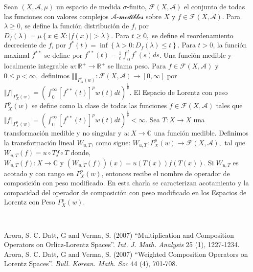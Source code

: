\begin{titlepage}
\begin{minipage}{0.85\linewidth}
\begin{minipage}{0.85\linewidth}
\begin{resumen}
Sean \emph{$(X,\mathcal{A},\mu)$ }un espacio de medida $\sigma$-finito,
$\mathcal{F}(X,\mathcal{A})$ el conjunto de todas las funciones con
valores complejos $\mathcal{A\textrm{-medibles}}$ sobre $X$ y $f\in\mathcal{F}(X,\mathcal{A})$.
Para $\lambda\geq0$, se define la funci\'on distribuci\'on de $f$, por
$D_{f}(\lambda)=\mu\left\{ x\in X:\left|f(x)\right|>\lambda\right\} .$
Para $t\geq0,$ se define el reordenamiento decreciente de $f$, por
$f^{*}(t)=\inf\left\{ \lambda>0:D_{f}(\lambda)\leq t\right\}.$ Para $t>0$, la funci\'on maximal
$f^{**}$ se define por $f^{**}(t)=\frac{1}{t}\int_{0}^{t}f^{*}(s)ds$.
Una funci\'on medible y localmente integrable $w:\mathbb{R}^{+}\rightarrow\mathbb{R}^{+}$
se llama peso. Para $f\in\mathcal{F}(X,\mathcal{A})$ y $0\leq p<\infty,$
definimos $\left\Vert \text{}\right\Vert _{\Gamma_{X}^{p}(w)}:\mathcal{F}(X,\mathcal{A})\rightarrow[0,\infty]$
por $\left\Vert f\right\Vert _{\Gamma_{X}^{p}(w)}=\left(\int_{0}^{\infty}\left[f^{**}(t)\right]^{p}w(t)dt\right)^{\frac{1}{p}}.$
El Espacio de Lorentz con peso $\Gamma_{X}^{p}(w)$ se define como
la clase de todas las funciones $f\in\mathcal{F}(X,\mathcal{A})$
tales que $\left\Vert f\right\Vert _{\Gamma_{X}^{p}(w)}=\left(\int_{0}^{\infty}\left[f^{**}(t)\right]^{p}w(t)dt\right)^{\frac{1}{p}}<\infty.$
Sea $T:X\rightarrow X$ una transformaci\'on medible y no singular y
$u:X\rightarrow\mathbb{C}$ una funci\'on medible. Definimos la transformaci\'on
lineal $W_{u,T}$, como sigue: $W_{u,T}:\Gamma_{X}^{p}(w)\rightarrow\mathcal{F}(X,\mathcal{A}),$
tal que $W_{u,T}(f)=u\circ T\text{}f\circ T$
donde, $W_{u,T}(f):X\rightarrow\mathbb{C}\textrm{ y }\left(W_{u,T}(f)\right)(x)=u\left(T(x)\right)\text{}f\left(T(x)\right)$.
Si $W_{u,T}$ es acotado y con rango en $\Gamma_{X}^{p}(w)$, entonces
recibe el nombre de operador de composici\'on con peso modificado. En
esta charla se caracterizan acotamiento y la compacidad del operador
de composici\'on con peso modificado en los Espacios de Lorentz con
Peso $\Gamma_{X}^{p}(w)$.

    \end{resumen}
   \end{minipage}
   \vspace{10pt}
\end{minipage}
\vspace{10pt}\\[5pt]
\begin{thebibliography}{99}

 {\sc Arora, S. C. Datt, G and Verma, S.} (2007) ``Multiplication and Composition Operators on Orlicz-Lorentz Spaces''. \emph{Int. J. Math. Analysis} 25 (1), 1227-1234.
 {\sc Arora, S. C. Datt, G and Verma, S.} (2007) ``Weighted Composition Operators on Lorentz Spaces''. \emph{Bull. Korean. Math. Soc} 44 (4), 701-708.
\end{thebibliography}
\end{titlepage}


